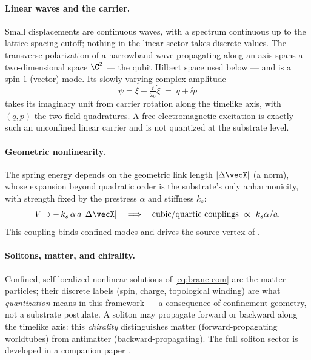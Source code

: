 \paragraph{Linear waves and the carrier.}
Small displacements are continuous waves, with a spectrum continuous up to the lattice-spacing
cutoff; nothing in the linear sector takes discrete values. The transverse polarization of a
narrowband wave propagating along an axis spans a two-dimensional space $\C^{2}$ --- the qubit
Hilbert space used below --- and is a spin-$1$ (vector) mode. Its slowly varying complex amplitude
\begin{equation}
  \psi=\xi+\tfrac{\ii}{\omega_0}\dot\xi \;=\; q+\ii p
  \label{eq:carrier}
\end{equation}
takes its imaginary unit from carrier rotation along the timelike axis, with $(q,p)$ the two field
quadratures. A free electromagnetic excitation is exactly such an unconfined linear carrier and is
not quantized at the substrate level.

\paragraph{Geometric nonlinearity.}
The spring energy depends on the geometric link length $|\Delta\vecX|$ (a norm), whose expansion
beyond quadratic order is the substrate's only anharmonicity, with strength fixed by the prestress
$\alpha$ and stiffness $k_s$:
\begin{equation}
  V\supset -\,k_s\,\alpha\,a\,|\Delta\vecX|
  \quad\Longrightarrow\quad
  \text{cubic/quartic couplings}\ \propto\ k_s\alpha/a .
  \label{eq:geom-nonlinear}
\end{equation}
This coupling binds confined modes and drives the source vertex of .

\paragraph{Solitons, matter, and chirality.}
Confined, self-localized nonlinear solutions of \eqref{eq:brane-eom} are the matter particles;
their discrete labels (spin, charge, topological winding) are what \emph{quantization} means in
this framework --- a consequence of confinement geometry, not a substrate postulate. A soliton may
propagate forward or backward along the timelike axis: this \emph{chirality} distinguishes matter
(forward-propagating worldtubes) from antimatter (backward-propagating). The full soliton sector
is developed in a companion paper \citep{MolzbergerMatterMass}.
